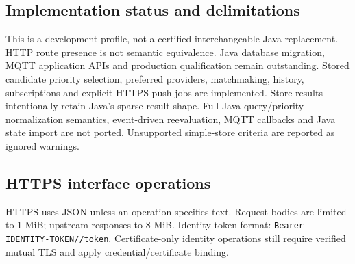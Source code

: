 \documentclass[a4paper]{arrowhead}
\begin{document}
\subsection{Implementation status and delimitations}
This is a development profile, not a certified interchangeable Java replacement. HTTP route presence is not semantic equivalence. Java database migration, MQTT application APIs and production qualification remain outstanding.
Stored candidate priority selection, preferred providers, matchmaking, history, subscriptions and explicit HTTPS push jobs are implemented. Store results intentionally retain Java's sparse result shape. Full Java query/priority-normalization semantics, event-driven reevaluation, MQTT callbacks and Java state import are not ported. Unsupported simple-store criteria are reported as ignored warnings.
\clearpage
\subsection{HTTPS interface operations}
HTTPS uses JSON unless an operation specifies text. Request bodies are limited to 1 MiB; upstream responses to 8 MiB. Identity-token format: \texttt{Bearer IDENTITY-TOKEN//token}. Certificate-only identity operations still require verified mutual TLS and apply credential/certificate binding.
\end{document}
